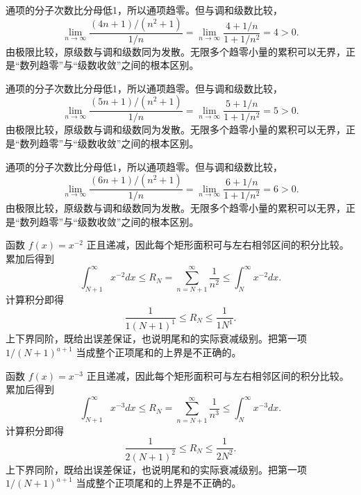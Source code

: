 \documentclass[UTF8,12pt,a4paper,fontset=fandol]{ctexart}
\begin{document}
\begin{solve}\label{ans:c25q16}
通项的分子次数比分母低1，所以通项趋零。但与调和级数比较，
\[
\lim_{n\to\infty}\frac{(4n+1)/(n^2+1)}{1/n}=\lim_{n\to\infty}\frac{4+1/n}{1+1/n^2}=4>0.
\]
由极限比较，原级数与调和级数同为发散。无限多个趋零小量的累积可以无界，正是“数列趋零”与“级数收敛”之间的根本区别。
\end{solve}

\begin{solve}\label{ans:c25q17}
通项的分子次数比分母低1，所以通项趋零。但与调和级数比较，
\[
\lim_{n\to\infty}\frac{(5n+1)/(n^2+1)}{1/n}=\lim_{n\to\infty}\frac{5+1/n}{1+1/n^2}=5>0.
\]
由极限比较，原级数与调和级数同为发散。无限多个趋零小量的累积可以无界，正是“数列趋零”与“级数收敛”之间的根本区别。
\end{solve}

\begin{solve}\label{ans:c25q18}
通项的分子次数比分母低1，所以通项趋零。但与调和级数比较，
\[
\lim_{n\to\infty}\frac{(6n+1)/(n^2+1)}{1/n}=\lim_{n\to\infty}\frac{6+1/n}{1+1/n^2}=6>0.
\]
由极限比较，原级数与调和级数同为发散。无限多个趋零小量的累积可以无界，正是“数列趋零”与“级数收敛”之间的根本区别。
\end{solve}

\begin{solve}\label{ans:c25q19}
函数 $f(x)=x^{-2}$ 正且递减，因此每个矩形面积可与左右相邻区间的积分比较。累加后得到
\[
\int_{N+1}^\infty x^{-2}dx\le R_N=\sum_{n=N+1}^\infty\frac1{n^{2}}\le\int_N^\infty x^{-2}dx.
\]
计算积分即得
\[
\frac1{1(N+1)^{1}}\le R_N\le\frac1{1N^{1}}.
\]
上下界同阶，既给出误差保证，也说明尾和的实际衰减级别。把第一项 $1/(N+1)^{a+1}$ 当成整个正项尾和的上界是不正确的。
\end{solve}

\begin{solve}\label{ans:c25q20}
函数 $f(x)=x^{-3}$ 正且递减，因此每个矩形面积可与左右相邻区间的积分比较。累加后得到
\[
\int_{N+1}^\infty x^{-3}dx\le R_N=\sum_{n=N+1}^\infty\frac1{n^{3}}\le\int_N^\infty x^{-3}dx.
\]
计算积分即得
\[
\frac1{2(N+1)^{2}}\le R_N\le\frac1{2N^{2}}.
\]
上下界同阶，既给出误差保证，也说明尾和的实际衰减级别。把第一项 $1/(N+1)^{a+1}$ 当成整个正项尾和的上界是不正确的。
\end{solve}
\end{document}
